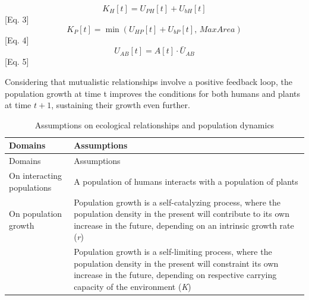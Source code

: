 \documentclass[
]{book}
\begin{document}
\[K_{H}[t]=U_{PH}[t]+U_{bH}[t]\] {[}Eq. 3{]}
\[K_{P}[t]=\min(U_{HP}[t]+U_{bP}[t],\, MaxArea)\] {[}Eq. 4{]}
\[U_{AB}[t]=A[t]\cdot \bar{U}_{AB}\] {[}Eq. 5{]}

Considering that mutualistic relationships involve a positive feedback loop, the population growth at time t improves the conditions for both humans and plants at time \(t + 1\), sustaining their growth even further.

\begin{longtable}[]{@{}ll@{}}
\caption{Assumptions on ecological relationships and population dynamics}\tabularnewline
\toprule
\begin{minipage}[b]{0.45\columnwidth}\raggedright
Domains\strut
\end{minipage} & \begin{minipage}[b]{0.49\columnwidth}\raggedright
Assumptions\strut
\end{minipage}\tabularnewline
\midrule
\endfirsthead
\toprule
\begin{minipage}[b]{0.45\columnwidth}\raggedright
Domains\strut
\end{minipage} & \begin{minipage}[b]{0.49\columnwidth}\raggedright
Assumptions\strut
\end{minipage}\tabularnewline
\midrule
\endhead
\begin{minipage}[t]{0.45\columnwidth}\raggedright
On interacting populations\strut
\end{minipage} & \begin{minipage}[t]{0.49\columnwidth}\raggedright
A population of humans interacts with a population of plants\strut
\end{minipage}\tabularnewline
\begin{minipage}[t]{0.45\columnwidth}\raggedright
On population growth\strut
\end{minipage} & \begin{minipage}[t]{0.49\columnwidth}\raggedright
Population growth is a self-catalyzing process, where the population density in the present will contribute to its own increase in the future, depending on an intrinsic growth rate (\emph{r})\strut
\end{minipage}\tabularnewline
\begin{minipage}[t]{0.45\columnwidth}\raggedright
﻿\strut
\end{minipage} & \begin{minipage}[t]{0.49\columnwidth}\raggedright
Population growth is a self-limiting process, where the population density in the present will constraint its own increase in the future, depending on respective carrying capacity of the environment (\emph{K})\strut

\end{minipage}
\end{longtable}
\end{document}
